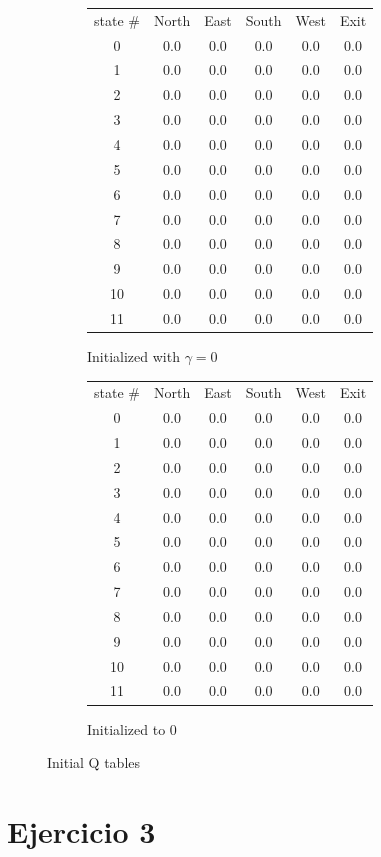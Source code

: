 \documentclass[12pt]{article}
\begin{document}
\begin{figure}[h]
    \centering
    \begin{subfigure}{.51\textwidth}
        \begin{tabular}{*{6}{c}|}
            state \# & North & East & South & West & Exit\\
            0 & 0.0 & 0.0 & 0.0 & 0.0 & 0.0 \\
            1 & 0.0 & 0.0 & 0.0 & 0.0 & 0.0 \\
            2 & 0.0 & 0.0 & 0.0 & 0.0 & 0.0 \\
            3 & 0.0 & 0.0 & 0.0 & 0.0 & 0.0 \\
            4 & 0.0 & 0.0 & 0.0 & 0.0 & 0.0 \\
            5 & 0.0 & 0.0 & 0.0 & 0.0 & 0.0 \\
            6 & 0.0 & 0.0 & 0.0 & 0.0 & 0.0 \\
            7 & 0.0 & 0.0 & 0.0 & 0.0 & 0.0 \\
            8 & 0.0 & 0.0 & 0.0 & 0.0 & 0.0 \\
            9 & 0.0 & 0.0 & 0.0 & 0.0 & 0.0 \\
            10 & 0.0 & 0.0 & 0.0 & 0.0 & 0.0 \\
            11 & 0.0 & 0.0 & 0.0 & 0.0 & 0.0 \\
        \end{tabular}
        \caption{Initialized with $\gamma = 0$}
        \label{fig:sub1}
    \end{subfigure}%
    \begin{subfigure}{.51\textwidth}
        \begin{tabular}{|*{6}{c}}
            state \# & North & East & South & West & Exit\\
            0 & 0.0 & 0.0 & 0.0 & 0.0 & 0.0 \\
            1 & 0.0 & 0.0 & 0.0 & 0.0 & 0.0 \\
            2 & 0.0 & 0.0 & 0.0 & 0.0 & 0.0 \\
            3 & 0.0 & 0.0 & 0.0 & 0.0 & 0.0 \\
            4 & 0.0 & 0.0 & 0.0 & 0.0 & 0.0 \\
            5 & 0.0 & 0.0 & 0.0 & 0.0 & 0.0 \\
            6 & 0.0 & 0.0 & 0.0 & 0.0 & 0.0 \\
            7 & 0.0 & 0.0 & 0.0 & 0.0 & 0.0 \\
            8 & 0.0 & 0.0 & 0.0 & 0.0 & 0.0 \\
            9 & 0.0 & 0.0 & 0.0 & 0.0 & 0.0 \\
            10 & 0.0 & 0.0 & 0.0 & 0.0 & 0.0 \\
            11 & 0.0 & 0.0 & 0.0 & 0.0 & 0.0 \\
        \end{tabular}
        \caption{Initialized to 0}
        \label{fig:sub2}
    \end{subfigure}
    \caption{Initial Q tables}
    \label{fig:test}
\end{figure}

\newpage
\section{Ejercicio 3}
\end{document}
